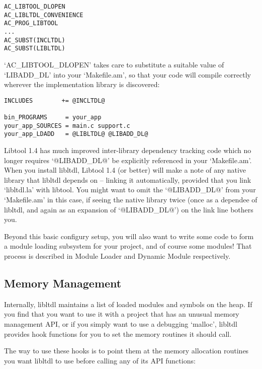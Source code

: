 \begin{enumerate}
\begin{Verbatim}[frame=single]
AC_LIBTOOL_DLOPEN
AC_LIBLTDL_CONVENIENCE
AC_PROG_LIBTOOL
...
AC_SUBST(INCLTDL)
AC_SUBST(LIBLTDL)
\end{Verbatim}

`AC\_{}LIBTOOL\_{}DLOPEN' takes care to substitute a suitable value of `LIBADD\_{}DL' into your `Makefile.am', so that your code will compile correctly wherever the implementation library is discovered:

\begin{Verbatim}[frame=single]
INCLUDES        += @INCLTDL@

bin_PROGRAMS     = your_app
your_app_SOURCES = main.c support.c
your_app_LDADD   = @LIBLTDL@ @LIBADD_DL@
\end{Verbatim}

\end{enumerate}

Libtool 1.4 has much improved inter-library dependency tracking code which no longer requires `@LIBADD\_{}DL@' be explicitly referenced in your `Makefile.am'. When you install libltdl, Libtool 1.4 (or better) will make a note of any native library that libltdl depends on -- linking it automatically, provided that you link `libltdl.la' with libtool. You might want to omit the `@LIBADD\_{}DL@' from your `Makefile.am' in this case, if seeing the native library twice (once as a dependee of libltdl, and again as an expansion of `@LIBADD\_{}DL@') on the link line bothers you.

Beyond this basic configury setup, you will also want to write some code to form a module loading subsystem for your project, and of course some modules! That process is described in Module Loader and Dynamic Module respectively. 

\subsection{Memory Management}

Internally, libltdl maintains a list of loaded modules and symbols on the heap. If you find that you want to use it with a project that has an unusual memory management API, or if you simply want to use a debugging `malloc', libltdl provides hook functions for you to set the memory routines it should call.

The way to use these hooks is to point them at the memory allocation routines you want libltdl to use before calling any of its API functions:

